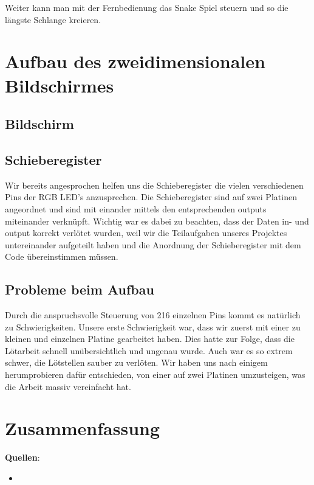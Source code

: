 \documentclass[12pt,a4paper]{article}
\begin{document}
Weiter kann man mit der Fernbedienung das Snake Spiel steuern und so die längste Schlange kreieren.

\section{Aufbau des zweidimensionalen Bildschirmes}

\subsection{Bildschirm}

\subsection{Schieberegister}

Wir bereits angesprochen helfen uns die Schieberegister die vielen verschiedenen Pins der RGB LED's anzusprechen.
Die Schieberegister sind auf zwei Platinen angeordnet und sind mit einander mittels den entsprechenden outputs miteinander
verknüpft. Wichtig war es dabei zu beachten, dass der Daten in- und output korrekt verlötet wurden, weil wir die Teilaufgaben
unseres Projektes untereinander aufgeteilt haben und die Anordnung der Schieberegister mit dem Code übereinstimmen müssen.

\subsection{Probleme beim Aufbau}

Durch die anspruchsvolle Steuerung von 216 einzelnen Pins kommt es
natürlich zu Schwierigkeiten. Unsere erste Schwierigkeit war, dass wir 
zuerst mit einer zu kleinen und einzelnen Platine gearbeitet haben. 
Dies hatte zur Folge, dass die Lötarbeit schnell unübersichtlich und ungenau wurde.
Auch war es so extrem schwer, die Lötstellen sauber zu verlöten. Wir haben uns nach einigem herumprobieren dafür entschieden, von einer auf zwei Platinen umzusteigen, was die Arbeit massiv vereinfacht hat.

\section{Zusammenfassung}

\newpage

\textbf{Quellen}:

\begin{itemize}
    \item 
\end{itemize}
\end{document}
